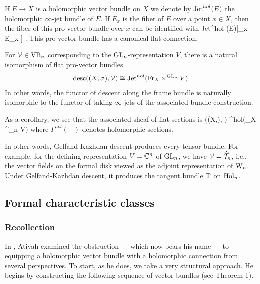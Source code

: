 If $E \to X$ is a holomorphic vector bundle on $X$ we denote by
${\rm Jet}^{hol}(E)$ the holomorphic $\infty$-jet bundle of $E$. If
$E_x$ is the fiber of $E$ over a point $x \in X$, then the fiber of
this pro-vector bundle over $x$ can be identified with
\ben
{\rm Jet}^{hol} (E)|_{x} \cong E_x \times \CC [[ t_1,\ldots,t_n]] .
\een
This pro-vector bundle has a canonical flat connection.

\begin{prop}
For $\mathcal{V} \in {\rm VB}_n$ corresponding to the ${\rm GL}_n$-representation $V$,
there is a natural isomorphism of flat pro-vector bundles
\[
{\rm desc}((X, \sigma),\mathcal{V}) \cong {\rm Jet}^{hol}({\rm Fr}_X
\times^{{\rm GL}_n} V)
\]
In other words, the functor of descent along the frame bundle is
naturally isomorphic to the functor of taking $\infty$-jets of the associated bundle construction.
\end{prop} 

As a corollary, we see that the associated sheaf of flat sections is
\ben
\sdesc ((X,\sigma), \cV) \cong \Gamma^{hol}(\Fr_X
\times^{\GL_n} V)
\een
where $\Gamma^{hol}(-)$ denotes holomorphic sections. 

In other words, Gelfand-Kazhdan descent produces every tensor bundle. 
For example, for the defining representation $V = \mathbb C^n$ of ${\rm GL}_n$, we have $\mathcal{V} =\widehat{\mathcal T}_n$, 
i.e., the vector fields on the formal disk viewed as the adjoint representation of  ${{\rm W}_n}$. 
Under Gelfand-Kazhdan descent, it produces the tangent bundle ${\rm T}$ on ${\rm Hol}_n$.


\subsection{Formal characteristic classes}

\subsubsection{Recollection}

In \cite{atiyah}, Atiyah examined the obstruction --- which now bears his name --- to equipping a holomorphic vector bundle with a holomorphic connection from several perspectives. To start, as he does, we take a very structural approach. He begins by constructing the following sequence of vector bundles (see Theorem 1).

